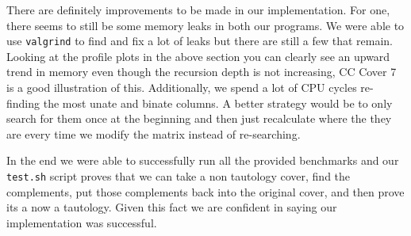 \documentclass[10pt]{article}
\begin{document}
There are definitely improvements to be made in our implementation. For one,
there seems to still be some memory leaks in both our programs. We were able to
use \texttt{valgrind} to find and fix a lot of leaks but there are still a few
that remain. Looking at the profile plots in the above section you can clearly
see an upward trend in memory even though the recursion depth is not
increasing, CC Cover 7 is a good illustration of this. Additionally, we spend a
lot of CPU cycles re-finding the most unate and binate columns. A better
strategy would be to only search for them once at the beginning and then just
recalculate where the they are every time we modify the matrix instead of
re-searching.

In the end we were able to successfully run all the provided benchmarks and our
\texttt{test.sh} script proves that we can take a non tautology cover, find the
complements, put those complements back into the original cover, and then prove
its a now a tautology. Given this fact we are confident in saying our
implementation was successful.
\end{document}
